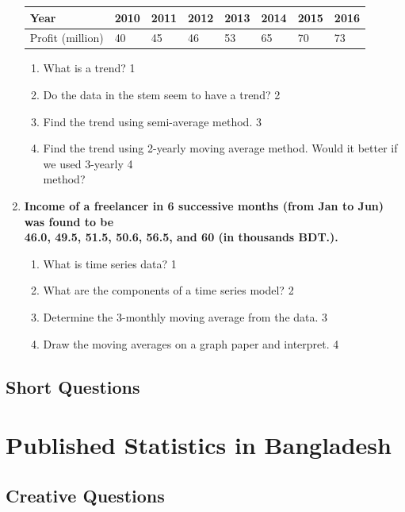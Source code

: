 \documentclass[a4paper,oneside]{book}
\begin{document}
\begin{enumerate}
	  \begin{table}[h]
	  \centering
\begin{tabular}{l|l|l|l|l|l|l|l}
Year & 2010 & 2011 & 2012 & 2013 & 2014 & 2015 & 2016 \\ \hline
Profit (million) & 40 & 45 & 46 & 53 & 65 & 70 & 73
\end{tabular}
\end{table}

  \begin{enumerate}
    \item
	What is a trend? \hfill 1
    \item
	Do the data in the stem seem to have a trend? \hfill 2
    \item  
	Find the trend using semi-average method. \hfill 3
    \item
	Find the trend using 2-yearly moving average method. Would it better if we used 3-yearly  \hfill 4 \\  method?
\end{enumerate}

 \item
	  \textbf{Income of a freelancer in 6 successive months (from Jan to Jun) was found to be \\ 46.0, 49.5, 51.5, 50.6, 56.5, and 60 (in thousands BDT.).}
  \begin{enumerate}
    \item
	What is time series data? \hfill 1
    \item
	What are the components of a time series model? \hfill 2
    \item  
	Determine the 3-monthly moving average from the data. \hfill 3
    \item
	Draw the moving averages on a graph paper and interpret. \hfill 4
\end{enumerate}

\end{enumerate}

\section{Short Questions}

\chapter{Published Statistics in Bangladesh} 
\section{Creative Questions}
\end{document}
